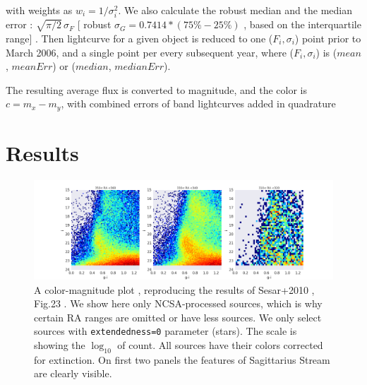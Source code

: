 \documentclass[fleqn,usenatbib]{mnras}  %
\begin{document}
with weights as  $w_{i} = 1 / \sigma_{i}^{2}$. We also calculate the robust  median and the median error : $\sqrt{\pi / 2} \, \sigma_{F}$  [ robust $\sigma_{G} = 0.7414 * (75\% - 25\%) $ , based on the interquartile range] . Then lightcurve for a given object is reduced to one ($F_{i}, \sigma_{i}$) point prior to March 2006, and a single point per every subsequent year, where  ($F_{i}, \sigma_{i}$) is ($mean$, $meanErr$) or ($median$, $medianErr$).


The resulting average flux is converted to magnitude, and the color is  $c = m_{x}-m_{y}$, with combined errors of band lightcurves added in quadrature




\section{Results}
\label{sec:results}


\begin{figure}
\label{fig:colors_example}
\includegraphics[width=\textwidth]{Fig_g-i_vs_i_ra_310-360hist_n_50row_ext_0.png}
\cprotect\caption{A color-magnitude plot , reproducing the results of Sesar+2010 , Fig.23 .  We show here only NCSA-processed sources, which is why certain RA ranges are omitted or have less sources. We only select sources with \verb|extendedness=0| parameter (stars).  The scale is showing the $\log_{10}$ of count. All sources have their  colors corrected for extinction. On first two panels the features of Sagittarius Stream are clearly visible. }
\end{figure}
% 
\end{document}
